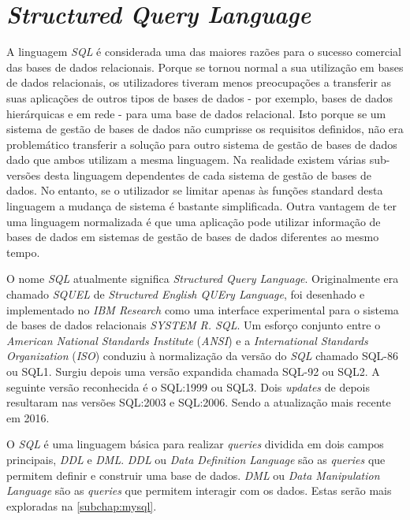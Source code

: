 \documentclass[11pt,twoside,a4paper]{report}
\begin{document}
\section{\textit{Structured Query Language}}
A linguagem \textit{SQL} é considerada uma das maiores razões para o sucesso comercial das bases de dados relacionais. Porque se tornou normal a sua utilização em bases de dados relacionais, os utilizadores tiveram menos preocupações a transferir as suas aplicações de outros tipos de bases de dados - por exemplo, bases de dados hierárquicas e em rede - para uma base de dados relacional. Isto porque se um sistema de gestão de bases de dados não cumprisse os requisitos definidos, não era problemático transferir a solução para outro sistema de gestão de bases de dados dado que ambos utilizam a mesma linguagem. Na realidade existem várias sub-versões desta linguagem dependentes de cada sistema de gestão de bases de dados. No entanto, se o utilizador se limitar apenas às funções standard desta linguagem a mudança de sistema é bastante simplificada. Outra vantagem de ter uma linguagem normalizada é que uma aplicação pode utilizar informação de bases de dados em sistemas de gestão de bases de dados diferentes ao mesmo tempo\cite{Elmasri:2010:FDS:1855347}.\par 
O nome \textit{SQL} atualmente significa \textit{Structured Query Language}. Originalmente era chamado \textit{SQUEL} de \textit{Structured English QUEry Language}, foi desenhado e implementado no \textit{IBM Research} como uma interface experimental para o sistema de bases de dados relacionais \textit{SYSTEM R. SQL}. Um esforço conjunto entre o \textit{American National Standards Institute} (\textit{ANSI}) e a \textit{International Standards Organization} (\textit{ISO}) conduziu à normalização da versão do \textit{SQL} chamado SQL-86 ou SQL1. Surgiu depois uma versão expandida chamada SQL-92 ou SQL2. A seguinte versão reconhecida é o SQL:1999 ou SQL3. Dois \textit{updates} de depois resultaram nas versões SQL:2003 e SQL:2006\cite{Elmasri:2010:FDS:1855347}. Sendo a atualização mais recente em 2016.\par 
O \textit{SQL} é uma linguagem básica para realizar \textit{queries} dividida em dois campos principais, \textit{DDL} e \textit{DML}. \textit{DDL} ou \textit{Data Definition Language} são as \textit{queries} que permitem definir e construir uma base de dados. \textit{DML} ou \textit{Data Manipulation Language} são as \textit{queries} que permitem interagir com os dados\cite{Elmasri:2010:FDS:1855347}. Estas serão mais exploradas na \autoref{subchap:mysql}.
\end{document}
